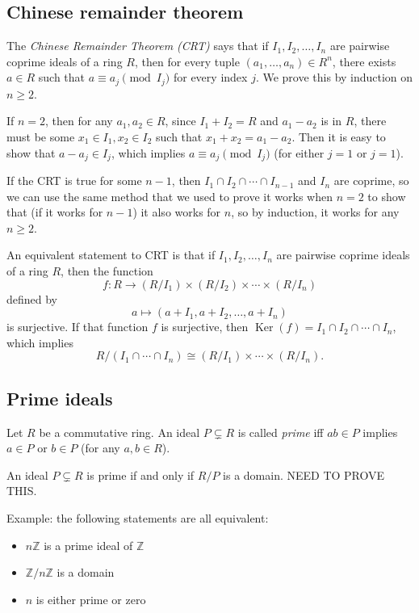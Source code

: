 \documentclass[12pt]{article}
\begin{document}
\subsection{Chinese remainder theorem}
The \textit{Chinese Remainder Theorem (CRT)} says that if $I_1, I_2, \dots, I_n$ are pairwise coprime ideals of a ring $R$, then for every tuple $(a_1, \dots, a_n) \in R^n$, there exists $a \in R$ such that $a \equiv a_j \pmod{I_j}$ for every index $j$. We prove this by induction on $n \geq 2$.
\par
If $n=2$, then for any $a_1, a_2 \in R$, since $I_1+I_2=R$ and $a_1-a_2$ is in $R$, there must be some $x_1 \in I_1, x_2 \in I_2$ such that $x_1+x_2=a_1-a_2$. Then it is easy to show that $a-a_j \in I_j$, which implies $a \equiv a_j \pmod{I_j}$ (for either $j=1$ or $j=1$).
\par
If the CRT is true for some $n-1$, then $I_1 \cap I_2 \cap \cdots \cap I_{n-1}$ and $I_n$ are coprime, so we can use the same method that we used to prove it works when $n=2$ to show that (if it works for $n-1$) it also works for $n$, so by induction, it works for any $n \geq 2$.
\par
An equivalent statement to CRT is that if $I_1, I_2, \dots, I_n$ are pairwise coprime ideals of a ring $R$, then the function
\[ f: R \rightarrow (R/I_1) \times (R/I_2) \times \cdots \times (R/I_n) \]
defined by
\[ a \mapsto (a+I_1, a+I_2, \dots, a+I_n) \]
is surjective. If that function $f$ is surjective, then $\operatorname{Ker}(f)=I_1\cap I_2 \cap \cdots \cap I_n$, which implies
\[ R/(I_1 \cap \cdots \cap I_n) \cong (R/I_1) \times \cdots \times (R/I_n). \]

\subsection{Prime ideals}
Let $R$ be a commutative ring. An ideal $P \subsetneq R$ is called \textit{prime} iff $ab \in P$ implies $a \in P$ or $b \in P$ (for any $a,b \in R$).
\par
An ideal $P \subsetneq R$ is prime if and only if $R/P$ is a domain. NEED TO PROVE THIS.
\par
Example: the following statements are all equivalent:
\begin{itemize}
    \item $n \mathbb{Z}$ is a prime ideal of $\mathbb{Z}$
    \item $\mathbb{Z}/n\mathbb{Z}$ is a domain
    \item $n$ is either prime or zero
\end{itemize}
\end{document}
